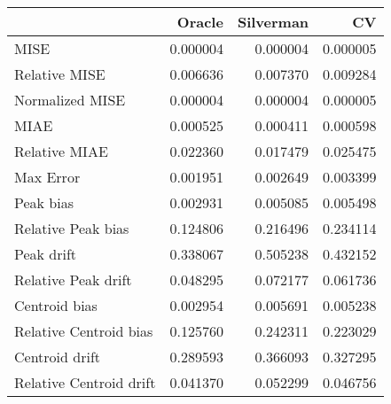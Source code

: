 \begin{tabular}{lrrr}
  \hline
 & Oracle & Silverman & CV \\ 
  \hline
MISE & 0.000004 & 0.000004 & 0.000005 \\ 
  Relative MISE & 0.006636 & 0.007370 & 0.009284 \\ 
  Normalized MISE & 0.000004 & 0.000004 & 0.000005 \\ 
  MIAE & 0.000525 & 0.000411 & 0.000598 \\ 
  Relative MIAE & 0.022360 & 0.017479 & 0.025475 \\ 
  Max Error & 0.001951 & 0.002649 & 0.003399 \\ 
  Peak bias & 0.002931 & 0.005085 & 0.005498 \\ 
  Relative Peak bias & 0.124806 & 0.216496 & 0.234114 \\ 
  Peak drift & 0.338067 & 0.505238 & 0.432152 \\ 
  Relative Peak drift & 0.048295 & 0.072177 & 0.061736 \\ 
  Centroid bias & 0.002954 & 0.005691 & 0.005238 \\ 
  Relative Centroid bias & 0.125760 & 0.242311 & 0.223029 \\ 
  Centroid drift & 0.289593 & 0.366093 & 0.327295 \\ 
  Relative Centroid drift & 0.041370 & 0.052299 & 0.046756 \\ 
   \hline
\end{tabular}

